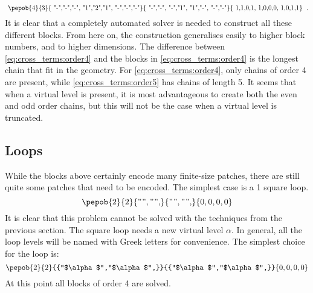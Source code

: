 \begin{equation}
    \vcenter{\hbox{ \pepob{4}{3}{{
                        "-","-","-",
                        "1","2","1",
                        "-","-","-"}}{{
                        "-","-",
                        "-","1",
                        "1","-",
                        "-","-"}}{{
                        1,1,0,1,
                        1,0,0,0,
                        1,0,1,1}} }} \; .
\end{equation}
It is clear that a completely automated solver is needed to construct all these different blocks. From here on, the construction generalises easily to higher block numbers, and to higher dimensions. The difference between \cref{eq:cross_terms:order4} and the blocks in \cref{eq:cross_terms:order4} is the longest chain that fit in the geometry. For \cref{eq:cross_terms:order4}, only chains of order 4 are present, while  \cref{eq:cross_terms:order5} has chains of length 5. It seems that when a virtual level is present, it is most advantageous to create both the even and odd order chains, but this will not be the case when a virtual level is truncated.

\subsection{Loops}

While the blocks above certainly encode many finite-size patches, there are still quite some patches that need to be encoded. The simplest case is a 1 square loop.
\begin{equation}
    {\pepob{2}{2}{{"","",}}{{"","",}}{{0,0,0,0}}}
\end{equation}
It is clear that this problem cannot be solved with the techniques from the previous section. The square loop needs a new virtual level $\alpha$. In general, all the loop levels will be named with Greek letters for convenience. The simplest choice for the loop is:
\begin{equation}\label{tikzfig:plaquetter}
    {\pepob{2}{2}{{"$\alpha$","$\alpha$",}}{{"$\alpha$","$\alpha$",}}{{0,0,0,0}}}
\end{equation}
At this point all blocks of order 4 are solved.

